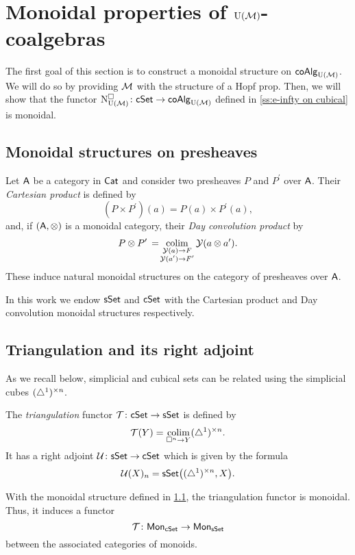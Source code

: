 
\section{Monoidal properties of \texorpdfstring{${\operatorname{U}(\mathcal{M})}$}{UM}-coalgebras} \label{s:monoidal}

The first goal of this section is to construct a monoidal structure on $\mathsf{coAlg}_{\operatorname{U}(\mathcal{M})}$.
We will do so by providing $\mathcal{M}$ with the structure of a Hopf prop.
Then, we will show that the functor $\operatorname{N^{\square}_{{\operatorname{U}(\mathcal{M})}}} \colon \mathsf{cSet} \to \mathsf{coAlg}_{{\operatorname{U}(\mathcal{M})}}$ defined in \cref{ss:e-infty on cubical} is monoidal.

\subsection{Monoidal structures on presheaves} \label{ss:day convolution}

Let $\mathsf{A}$ be a category in $\mathsf{Cat}$ and consider two presheaves $P$ and $P^\prime$ over $\mathsf{A}$.
Their \textit{Cartesian product} is defined by
\[
(P \times P^\prime)(a) = P(a) \times P^\prime(a),
\]
and, if $(\mathsf{A}, \otimes)$ is a monoidal category, their \textit{Day convolution product} by
\[
P \otimes P^\prime \, = \! \operatorname*{colim}_{\substack{\mathcal{Y}(a) \to F \\ \mathcal{Y}(a^\prime) \to F^\prime}} \mathcal{Y}(a \otimes a^\prime).
\]
These induce natural monoidal structures on the category of presheaves over $\mathsf{A}$.

In this work we endow $\mathsf{sSet}$ and $\mathsf{cSet}$ with the Cartesian product and Day convolution monoidal structures respectively.


\subsection{Triangulation and its right adjoint} \label{ss:triangulation and its adjoint}

As we recall below, simplicial and cubical sets can be related using the simplicial cubes $(\triangle^1)^{\times n}$.

The \textit{triangulation} functor $\mathcal{T} \colon \mathsf{cSet} \to \mathsf{sSet}$ is defined by
\[
\mathcal{T}(Y) = \operatorname*{colim}_{\square^n \to Y} (\triangle^1)^{\times n}.
\]
It has a right adjoint $\mathcal{U} \colon \mathsf{sSet} \to \mathsf{cSet}$ which is given by the formula
\[
\mathcal{U}(X)_n = \mathsf{sSet} \big( (\triangle^1)^{\times n}, X \big).
\]

With the monoidal structure defined in \cref{ss:day convolution}, the triangulation functor is monoidal.
Thus, it induces a functor
\[
\mathcal{T} \colon \mathsf{Mon}_{\mathsf{cSet}} \to \mathsf{Mon}_{\mathsf{sSet}}
\]
between the associated categories of monoids.

